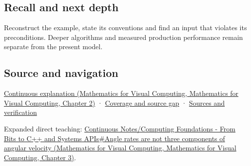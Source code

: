 \subsection{Recall and next depth}\label{appendix-5f723fbd0593-recall-and-next-depth}

Reconstruct the example, state its conventions and find an input that violates its preconditions. Deeper algorithms and measured production performance remain separate from the present model.

\subsection{Source and navigation}\label{appendix-5f723fbd0593-source-and-navigation}

\href{../02-Mathematics-for-Visual-Computing/main.pdf\#nameddest=01-foundations-i-ch018-keep-the-promises-visible-while-moving-between-representations}{Continuous explanation (Mathematics for Visual Computing, Mathematics for Visual Computing, Chapter 2)} · \hyperref[appendix-fd090d982a15-phase-7---parts-601-700]{Coverage and source gap} · \hyperref[appendix-a103e7846d21-phase-7---source-analysis-and-verification]{Sources and verification}

Expanded direct teaching: \href{../02-Mathematics-for-Visual-Computing/main.pdf\#nameddest=01-foundations-i-ch019-angle-rates-are-not-three-components-of-angular-velocity}{Continuous Notes/Computing Foundations - From Bits to C++ and Systems APIs\#Angle rates are not three components of angular velocity (Mathematics for Visual Computing, Mathematics for Visual Computing, Chapter 3)}.

